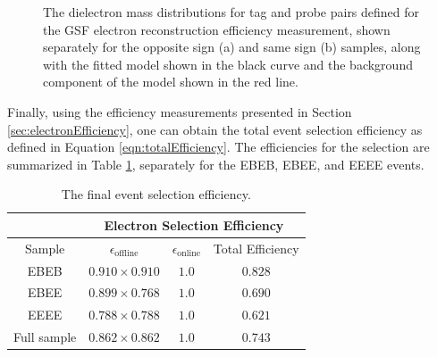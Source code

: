 \documentclass{cmspaper}
\begin{document}
\begin{figure}[htb]
  \begin{center}
    \caption{The dielectron mass distributions for tag and probe pairs defined for the GSF electron reconstruction efficiency measurement, shown separately for the opposite sign (a) and same sign (b) samples, along with the fitted model shown in the black curve and the background component of the model shown in the red line. }
    \label{fig:ZeeSSOSMergedMassFit_SignalPlusBkg}
  \end{center}
\end{figure}




Finally, using the efficiency measurements presented in Section \ref{sec:electronEfficiency}, one can obtain the total event selection efficiency as defined in Equation \ref{eqn:totalEfficiency}. The efficiencies for the \Z\To\Ep\Em selection are summarized in Table \ref{tab:finalZeeEventSelectionEfficiency}, separately for the EBEB, EBEE, and EEEE events. 


\begin{table}[!ht]
\begin{center}
\begin{tabular}{|c|c|c|c|}
\hline
 & \multicolumn{3}{|c|}{Electron Selection Efficiency} \\
\hline
 Sample & $\epsilon_{\mathrm{offline}}$ & $\epsilon_{\mathrm{online}}$ & Total Efficiency \\
\hline
\hline
 EBEB                    & $0.910 \times 0.910$  &  $1.0$ & $0.828$ \\
 EBEE                    & $0.899 \times 0.768$  &  $1.0$ & $0.690$ \\
 EEEE                    & $0.788 \times 0.788$  &  $1.0$ & $0.621$ \\
 Full sample             & $0.862 \times 0.862$  &  $1.0$ & $0.743$ \\
\hline                               
\end{tabular}
\caption{The final \Z\To\Ep\Em event selection efficiency.  \label{tab:finalZeeEventSelectionEfficiency}}
\end{center}
\end{table}
\end{document}
